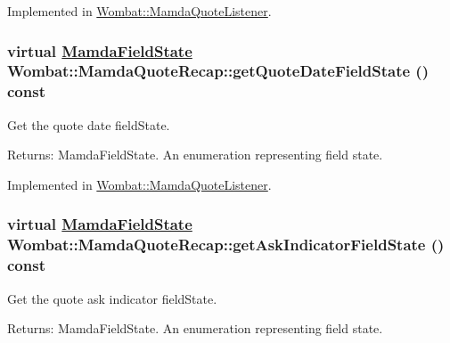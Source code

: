 Implemented in \hyperlink{classWombat_1_1MamdaQuoteListener_a8d10456d404dc1ed3fe7231e89a62b3}{Wombat::Mamda\-Quote\-Listener}.\hypertarget{classWombat_1_1MamdaQuoteRecap_475b6c9bd5ed474b3ac1e463cf199d8c}{
\subsubsection[getQuoteDateFieldState]{\setlength{\rightskip}{0pt plus 5cm}virtual \hyperlink{namespaceWombat_93aac974f2ab713554fd12a1fa3b7d2a}{Mamda\-Field\-State} Wombat::Mamda\-Quote\-Recap::get\-Quote\-Date\-Field\-State () const}}
\label{classWombat_1_1MamdaQuoteRecap_475b6c9bd5ed474b3ac1e463cf199d8c}


Get the quote date field\-State. 

\begin{Desc}
\item[Returns:]Mamda\-Field\-State. An enumeration representing field state. \end{Desc}


Implemented in \hyperlink{classWombat_1_1MamdaQuoteListener_bbf7249c368d73feb54836bb02a7269a}{Wombat::Mamda\-Quote\-Listener}.\hypertarget{classWombat_1_1MamdaQuoteRecap_b788be211493a7091449796df22c6173}{
\subsubsection[getAskIndicatorFieldState]{\setlength{\rightskip}{0pt plus 5cm}virtual \hyperlink{namespaceWombat_93aac974f2ab713554fd12a1fa3b7d2a}{Mamda\-Field\-State} Wombat::Mamda\-Quote\-Recap::get\-Ask\-Indicator\-Field\-State () const}}
\label{classWombat_1_1MamdaQuoteRecap_b788be211493a7091449796df22c6173}


Get the quote ask indicator field\-State. 

\begin{Desc}
\item[Returns:]Mamda\-Field\-State. An enumeration representing field state. \end{Desc}


